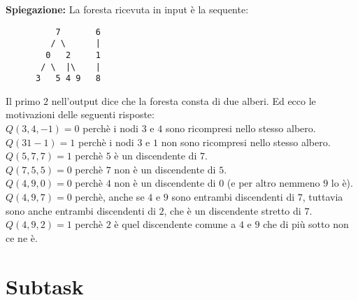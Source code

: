 \documentclass[a4paper,11pt]{article}
\begin{document}
{\bf Spiegazione:}
La foresta ricevuta in input è la sequente:
\begin{verbatim}
          7       6
         / \      |
        0   2     1
       / \  |\    |
      3   5 4 9   8
\end{verbatim}
Il primo $2$ nell'output dice che la foresta consta di due alberi. Ed ecco le motivazioni delle seguenti risposte:\\
$Q(3,4,-1)=0$ perchè i nodi $3$ e $4$ sono ricompresi nello stesso albero.\\
$Q(3 1 -1)=1$ perchè i nodi $3$ e $1$ non sono ricompresi nello stesso albero.\\
$Q(5,7,7)=1$ perchè $5$ è un discendente di $7$.\\ 
$Q(7,5,5)=0$ perchè $7$ non è un discendente di $5$.\\
$Q(4,9,0)=0$ perchè $4$ non è un discendente di $0$ (e per altro nemmeno $9$ lo è).\\
$Q(4,9,7)=0$ perchè, anche se $4$ e $9$ sono entrambi discendenti di $7$, tuttavia sono anche entrambi discendenti di $2$, che è un discendente stretto di $7$.\\
$Q(4,9,2)=1$ perchè $2$ è quel discendente comune a $4$ e $9$ che di più sotto non ce ne è.\\ 




\section*{Subtask}
\end{document}
